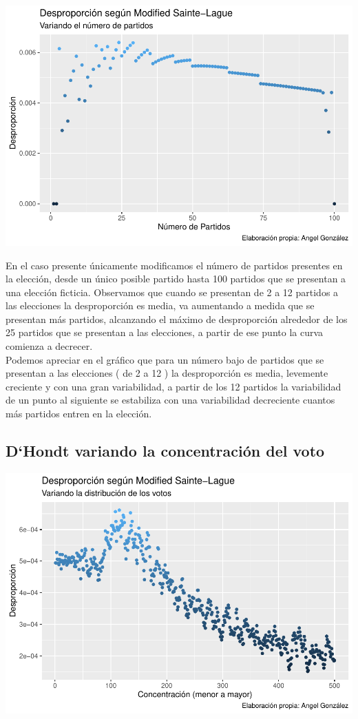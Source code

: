 \documentclass[12pt,a4paper,]{book}
\numberwithin{dummy}{section}
\theoremstyle{ocrenumbox}
\theoremstyle{blacknumex}
\theoremstyle{blacknumbox}
\theoremstyle{ocrenum}
\theoremstyle{ocrenum}
\begin{document}
\begin{center}\includegraphics[width=0.95\linewidth]{figurasR/unnamed-chunk-17-1} \end{center}

En el caso presente únicamente modificamos el número de partidos
presentes en la elección, desde un único posible partido hasta 100
partidos que se presentan a una elección ficticia. Observamos que cuando
se presentan de 2 a 12 partidos a las elecciones la desproporción es
media, va aumentando a medida que se presentan más partidos, alcanzando
el máximo de desproporción alrededor de los 25 partidos que se presentan
a las elecciones, a partir de ese punto la curva comienza a decrecer.\\
Podemos apreciar en el gráfico que para un número bajo de partidos que
se presentan a las elecciones ( de 2 a 12 ) la desproporción es media,
levemente creciente y con una gran variabilidad, a partir de los 12
partidos la variabilidad de un punto al siguiente se estabiliza con una
variabilidad decreciente cuantos más partidos entren en la elección.

\hypertarget{dhondt-variando-la-concentraciuxf3n-del-voto}{%
\subsection{D`Hondt variando la concentración del
voto}\label{dhondt-variando-la-concentraciuxf3n-del-voto}}

\begin{center}\includegraphics[width=0.95\linewidth]{figurasR/unnamed-chunk-18-1} \end{center}
\end{document}
